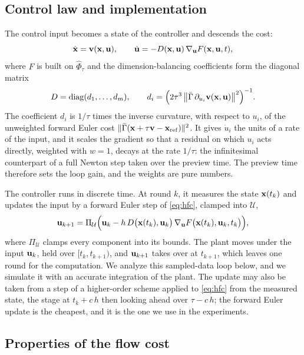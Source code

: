\subsection{Control law and implementation}\label{sec:extended}

The control input becomes a state of the controller and descends the cost:
\begin{equation}\label{eq:hfc}
    \dot\bx = \bv(\bx,\bu), \qquad \dot\bu = -D(\bx,\bu)\,\nabla_{\bu}F(\bx,\bu,t),
\end{equation}
where $F$ is built on $\hat\Phi_\tau$ and the dimension-balancing coefficients form the diagonal
matrix
\begin{equation}\label{eq:D}
    D = \diag(d_1,\dots,d_m), \qquad
    d_i = \Bigl(2\tau^3\,\norm[\big]{\bar\Gamma\,\partial_{u_i}\bv(\bx,\bu)}^2\Bigr)^{-1}.
\end{equation}
The coefficient $d_i$ is $1/\tau$ times the inverse curvature, with respect to $u_i$, of the
unweighted forward Euler cost $\norm{\bar\Gamma(\bx + \tau\bv - \bxref)}^2$.
It gives $\dot u_i$ the units of a rate of the input, and it scales the gradient so that a residual
on which $u_i$ acts directly, weighted with $w = 1$, decays at the rate $1/\tau$: the infinitesimal
counterpart of a full Newton step taken over the preview time.
The preview time therefore sets the loop gain, and the weights are pure numbers.

The controller runs in discrete time.
At round $k$, it measures the state $\bx(t_k)$ and updates the input by a forward Euler step of
\eqref{eq:hfc}, clamped into $\mathcal{U}$,
\begin{equation}\label{eq:update}
    \bu_{k+1} = \Pi_{\mathcal{U}}\Bigl(\bu_k - h\,D\bigl(\bx(t_k),\bu_k\bigr)\,
        \nabla_{\bu}F\bigl(\bx(t_k),\bu_k,t_k\bigr)\Bigr),
\end{equation}
where $\Pi_{\mathcal{U}}$ clamps every component into its bounds.
The plant moves under the input $\bu_k$, held over $[t_k,t_{k+1})$, and $\bu_{k+1}$ takes over at
$t_{k+1}$, which leaves one round for the computation.
We analyze this sampled-data loop below, and we simulate it with an accurate integration of the
plant.
The update may also be taken from a step of a higher-order scheme applied to \eqref{eq:hfc} from the
measured state, the stage at $t_k + c\,h$ then looking ahead over $\tau - c\,h$; the forward Euler
update is the cheapest, and it is the one we use in the experiments.

\subsection{Properties of the flow cost}\label{sec:properties}

